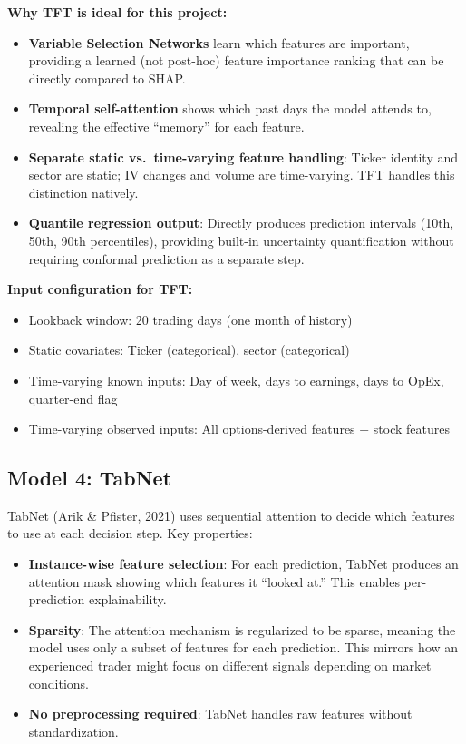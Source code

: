 \documentclass[11pt,a4paper]{article}
\begin{document}
\textbf{Why TFT is ideal for this project:}
\begin{itemize}[nosep]
    \item \textbf{Variable Selection Networks} learn which features are important, providing a learned (not post-hoc) feature importance ranking that can be directly compared to SHAP.
    \item \textbf{Temporal self-attention} shows which past days the model attends to, revealing the effective ``memory'' for each feature.
    \item \textbf{Separate static vs.\ time-varying feature handling}: Ticker identity and sector are static; IV changes and volume are time-varying. TFT handles this distinction natively.
    \item \textbf{Quantile regression output}: Directly produces prediction intervals (10th, 50th, 90th percentiles), providing built-in uncertainty quantification without requiring conformal prediction as a separate step.
\end{itemize}

\textbf{Input configuration for TFT:}
\begin{itemize}[nosep]
    \item Lookback window: 20 trading days (one month of history)
    \item Static covariates: Ticker (categorical), sector (categorical)
    \item Time-varying known inputs: Day of week, days to earnings, days to OpEx, quarter-end flag
    \item Time-varying observed inputs: All options-derived features + stock features
\end{itemize}

\subsection{Model 4: TabNet}

TabNet (Arik \& Pfister, 2021) uses sequential attention to decide which features to use at each decision step. Key properties:

\begin{itemize}[nosep]
    \item \textbf{Instance-wise feature selection}: For each prediction, TabNet produces an attention mask showing which features it ``looked at.'' This enables per-prediction explainability.
    \item \textbf{Sparsity}: The attention mechanism is regularized to be sparse, meaning the model uses only a subset of features for each prediction. This mirrors how an experienced trader might focus on different signals depending on market conditions.
    \item \textbf{No preprocessing required}: TabNet handles raw features without standardization.
\end{itemize}
\end{document}
